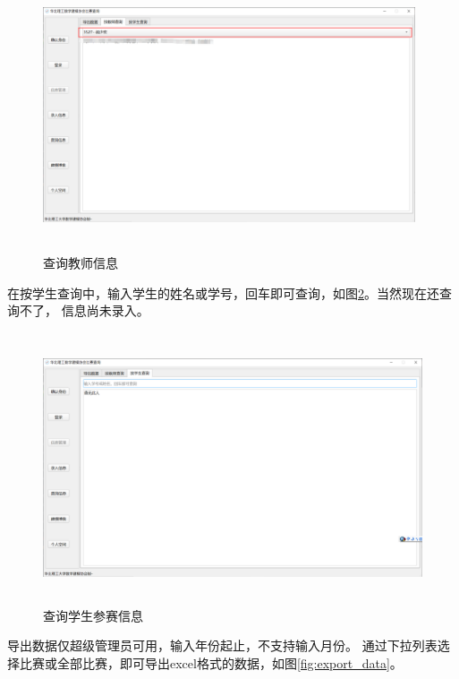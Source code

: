 \documentclass[cn, 11pt, chinese, show]{elegantbook}
\begin{document}
\begin{figure}[h]
    \centering
    \includegraphics[width=11cm, height=8cm]{figure/7.png}
    \caption{查询教师信息}
    \label{fig:query_teacher}
\end{figure}

\newpage

在按学生查询中，输入学生的姓名或学号，回车即可查询，如图\ref{fig:query_student}。当然现在还查询不了， 信息尚未录入。

\begin{figure}[h]
    \centering
    \includegraphics[width=12cm, height=8cm]{figure/8.png}
    \caption{查询学生参赛信息}
    \label{fig:query_student}
\end{figure}

导出数据仅超级管理员可用，输入年份起止，不支持输入月份。
通过下拉列表选择比赛或全部比赛，即可导出excel格式的数据，如图\ref{fig:export_data}。
\end{document}
